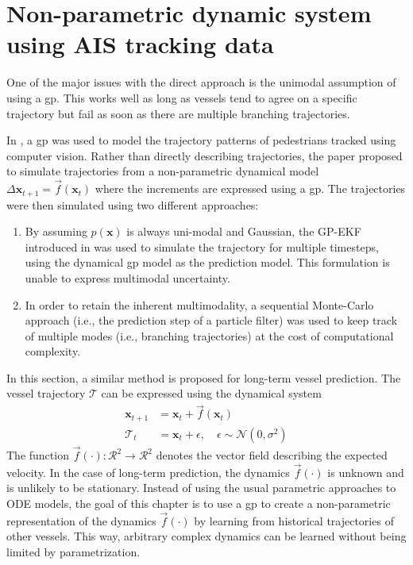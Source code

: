 \chapter{Non-parametric dynamic system using AIS tracking data}
One of the major issues with the direct approach is the unimodal assumption of using a \acrshort{gp}. This works well as long as vessels tend to agree on a specific trajectory but fail as soon as there are multiple branching trajectories.

In \cite{pedestrian}, a \acrshort{gp} was used to model the trajectory patterns of pedestrians tracked using computer vision. Rather than directly describing trajectories, the paper proposed to simulate trajectories from a non-parametric dynamical model $\Delta\boldsymbol{x}_{t+1} = \vec{f}(\boldsymbol{x}_t)$ where the increments are expressed using a \acrshort{gp}. The trajectories were then simulated using two different approaches:
\begin{enumerate}
    \item By assuming $p(\boldsymbol{x})$ is always uni-modal and Gaussian, the GP-EKF introduced in \cite{gpekf} was used to simulate the trajectory for multiple timesteps, using the dynamical \acrshort{gp} model as the prediction model. This formulation is unable to express multimodal uncertainty.
    \item In order to retain the inherent multimodality, a sequential Monte-Carlo approach (i.e., the prediction step of a particle filter) was used to keep track of multiple modes (i.e., branching trajectories) at the cost of computational complexity.
\end{enumerate}

In this section, a similar method is proposed for long-term vessel prediction. The vessel trajectory $\boldsymbol{\mathcal{T}}$ can be expressed using the dynamical system
\begin{subequations}
    \begin{align}
        \boldsymbol{x}_{t+1} & = \boldsymbol{x}_t + \vec{f}(\boldsymbol{x}_t)                              \\
        \mathcal{T}_t        & = \boldsymbol{x}_t + \epsilon, \quad \epsilon \sim \mathcal{N}(0, \sigma^2)
    \end{align}
\end{subequations}
The function $\vec{f}(\cdot): \mathcal{R}^2 \to \mathcal{R}^2$ denotes the vector field describing the expected velocity. In the case of long-term prediction, the dynamics $\vec{f}(\cdot)$ is unknown and is unlikely to be stationary. Instead of using the usual parametric approaches to ODE models, the goal of this chapter is to use a \acrshort{gp} to create a non-parametric representation of the dynamics $\vec{f}(\cdot)$ by learning from historical trajectories of other vessels. This way, arbitrary complex dynamics can be learned without being limited by parametrization.

